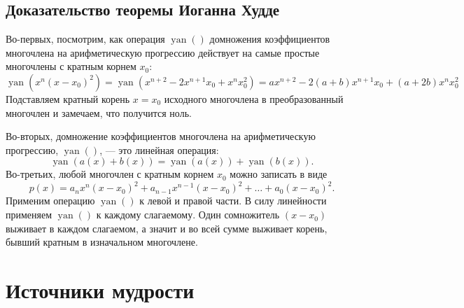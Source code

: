 \documentclass[12pt]{article}
\DeclareMathOperator{\yan}{yan}
\begin{document}
\subsection*{Доказательство теоремы Иоганна Худде}

Во-первых, посмотрим, как операция $\yan()$ домножения коэффициентов многочлена на арифметическую прогрессию 
действует на самые простые многочлены с кратным корнем $x_0$:
\[
\yan(x^n(x - x_0)^2) = \yan(x^{n+2} - 2x^{n+1} x_0 + x^n x_0^2) = ax^{n+2} - 2(a + b)x^{n+1} x_0 + (a+2b)x^n x_0^2
\]
Подставляем кратный корень $x = x_0$ исходного многочлена  в преобразованный многочлен и замечаем, что получится ноль. 

Во-вторых, домножение коэффициентов многочлена на арифметическую прогрессию, $\yan()$, — это линейная операция:
\[
\yan(a(x) + b(x)) = \yan(a(x)) + \yan(b(x)).
\]
Во-третьих, любой многочлен с кратным корнем $x_0$ можно записать в виде
\[
p(x) = a_n x^n (x - x_0)^2 + a_{n-1} x^{n-1}(x - x_0)^2 + \dots + a_0 (x - x_0)^2.
\]
Применим операцию $\yan()$ к левой и правой части. 
В силу линейности применяем $\yan()$ к каждому слагаемому.
Один сомножитель $(x - x_0)$ выживает в каждом слагаемом, а значит и во всей сумме выживает корень, бывший кратным в изначальном многочлене.


\section*{Источники мудрости}
\printbibliography[heading=none]
\end{document}
